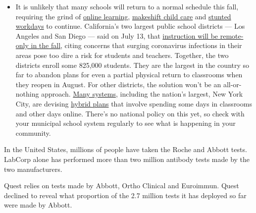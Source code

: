 \begin{itemize}
  \begin{itemize}
  \tightlist
  \item
    It is unlikely that many schools will return to a normal schedule
    this fall, requiring the grind of
    \href{https://www.nytimes.com/2020/06/05/us/coronavirus-education-lost-learning.html?action=click\&pgtype=Article\&state=default\&region=MAIN_CONTENT_3\&context=storylines_faq}{online
    learning},
    \href{https://www.nytimes.com/2020/05/29/us/coronavirus-child-care-centers.html?action=click\&pgtype=Article\&state=default\&region=MAIN_CONTENT_3\&context=storylines_faq}{makeshift
    child care} and
    \href{https://www.nytimes.com/2020/06/03/business/economy/coronavirus-working-women.html?action=click\&pgtype=Article\&state=default\&region=MAIN_CONTENT_3\&context=storylines_faq}{stunted
    workdays} to continue. California's two largest public school
    districts --- Los Angeles and San Diego --- said on July 13, that
    \href{https://www.nytimes.com/2020/07/13/us/lausd-san-diego-school-reopening.html?action=click\&pgtype=Article\&state=default\&region=MAIN_CONTENT_3\&context=storylines_faq}{instruction
    will be remote-only in the fall}, citing concerns that surging
    coronavirus infections in their areas pose too dire a risk for
    students and teachers. Together, the two districts enroll some
    825,000 students. They are the largest in the country so far to
    abandon plans for even a partial physical return to classrooms when
    they reopen in August. For other districts, the solution won't be an
    all-or-nothing approach.
    \href{https://bioethics.jhu.edu/research-and-outreach/projects/eschool-initiative/school-policy-tracker/}{Many
    systems}, including the nation's largest, New York City, are
    devising
    \href{https://www.nytimes.com/2020/06/26/us/coronavirus-schools-reopen-fall.html?action=click\&pgtype=Article\&state=default\&region=MAIN_CONTENT_3\&context=storylines_faq}{hybrid
    plans} that involve spending some days in classrooms and other days
    online. There's no national policy on this yet, so check with your
    municipal school system regularly to see what is happening in your
    community.
  \end{itemize}
\end{itemize}

In the United States, millions of people have taken the Roche and Abbott
tests. LabCorp alone has performed more than two million antibody tests
made by the two manufacturers.

Quest relies on tests made by Abbott, Ortho Clinical and Euroimmun.
Quest declined to reveal what proportion of the 2.7 million tests it has
deployed so far were made by Abbott.

